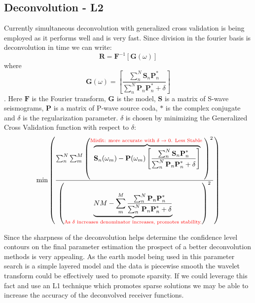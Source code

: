 \documentclass[jgrga]{agutex}
\newcommand{\bt}[1]{\textbf{#1}}
\newcommand{\bc}[1]{\mathcal{\textbf{#1}}}
\newcommand{\ub}[1]{\underbrace{#1}}
\newcommand{\ob}[1]{\overbrace{#1}}
\begin{document}
\begin{article}
\section{Deconvolution - L2}
Currently simultaneous deconvolution with generalized cross validation is being employed as it performs well and is very fast. Since division in the fourier basis is deconvolution in time we can write:
\[ \bc{R} = \bc{F}^{-1}[\bc{G}(\omega)]  \]
where
\[ \bc{G}(\omega) = \left[ \frac{\sum_n^N \bt{S}_n\bt{P}_n^*}{\sum_n^N \bt{P}_n\bt{P}_n^* + \delta}  \right] \].
Here $\bc{F}$ is the Fourier transform, $\bc{G}$ is the model, $\bt{S}$ is a matrix of S-wave seismograms, $\bt{P}$ is a matrix of P-wave source coda, $*$ is the complex conjugate and $\delta$ is the regularization parameter. $\delta$ is chosen by minimizing the Generalized Cross Validation function with respect to $\delta$:
\[ \text{min} \left( \frac{ \sum_n^N \sum_m^M 
 \left( \ob{ \bt{S}_n(\omega_m) - \bt{P}(\omega_m) \left[ \frac{\sum_n^N \bt{S}_n\bt{P}_n^*} {\sum_n^N \bt{P}_n\bt{P}_n^* + \delta}  \right]}^{\text{\textcolor{red}{ Misfit: more accurate with $\delta\rightarrow0$. Less Stable }}} \right)^2}  { \left( 
\ub{  NM - \sum_m^M  \frac {\sum_n^N \bt{P}_n\bt{P}_n^*}  {\sum_n^N \bt{P}_n\bt{P}_n^* + \delta}  }_{\text{\textcolor{red}{ {As $\delta$ increases denominator increases, promotes stability.}}}} \right)^2  }  \right)  \] 

Since the sharpness of the deconvolution helps determine the confidence level contours on the final parameter estimation the prospect of a better deconvolution methods is very appealing. As the earth model being used in this parameter search is a simple layered model and the data is piecewise smooth the wavelet transform could be effectively used to promote sparsity. If we could leverage this fact and use an L1 technique which promotes sparse solutions we may be able to increase the accuracy of the deconvolved receiver functions. 



\end{article}
\end{document}
